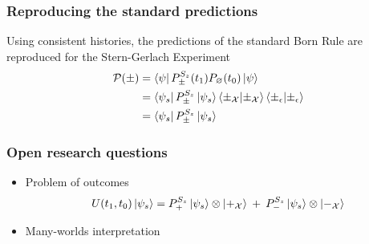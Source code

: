 \documentclass{beamer}
\begin{document}
\begin{frame}
  \frametitle{Reproducing the standard predictions}
Using consistent histories, the predictions of the standard Born Rule are reproduced for the Stern-Gerlach Experiment
  \begin{align*}
  \mathcal{P}(\pm) &= \bra{\psi} P^{S_z}_\pm(t_1) P_\varnothing(t_0) \ket{\psi} \\ \nonumber
   &= \bra{\psi_s} P^{S_z}_\pm \ket{\psi_s} \braket{\pm_\mathcal{X}|\pm_\mathcal{X}} \braket{\pm_\epsilon|\pm_\epsilon} \\ \nonumber
   &= \bra{\psi_s} P^{S_z}_\pm \ket{\psi_s}
\end{align*}
\end{frame}

\begin{frame}
  \frametitle{Open research questions}
  \begin{itemize}
    \item Problem of outcomes
    \begin{align*}
        U(t_1, t_0)\ket{\psi_s}  =  P^{S_z}_+ \ket{\psi_s} \otimes \ket{+_{\mathcal{X}}} \: + \: P^{S_z}_- \ket{\psi_s} \otimes \ket{-_{\mathcal{X}}}
    \end{align*}
    \item Many-worlds interpretation
  \end{itemize}
\end{frame}
\end{document}
